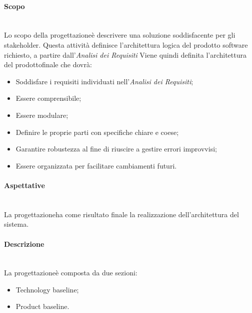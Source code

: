 \paragraph*{Scopo}\mbox{}\\ [1mm]
Lo scopo della progettazione\glosp è descrivere una soluzione soddisfacente per gli stakeholder\glo. Questa attività definisce l'architettura logica del prodotto software richiesto, a partire dall'\textit{Analisi dei Requisiti}
Viene quindi definita l'architettura del prodotto\glosp finale che dovrà:
\begin{itemize}
	\item Soddisfare i requisiti individuati nell'\textit{Analisi dei Requisiti};
	\item Essere comprensibile;
	\item Essere modulare;
	\item Definire le proprie parti con specifiche chiare e coese;
	\item Garantire robustezza al fine di riuscire a gestire errori improvvisi;
	\item Essere organizzata per facilitare cambiamenti futuri.
\end{itemize}
\paragraph*{Aspettative}\mbox{}\\ [1mm]
La progettazione\glosp ha come risultato finale la realizzazione dell'architettura del sistema.
\paragraph*{Descrizione}\mbox{}\\ [1mm]
La progettazione\glosp è composta da due sezioni:
\begin{itemize}
	\item Technology baseline\glo;
	\item Product baseline\glo.	
\end{itemize}
